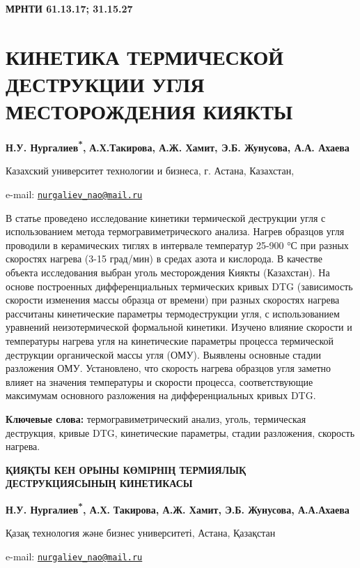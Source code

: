 \clearpage
{\bfseries МРНТИ 61.13.17; 31.15.27}

\section{КИНЕТИКА ТЕРМИЧЕСКОЙ ДЕСТРУКЦИИ УГЛЯ МЕСТОРОЖДЕНИЯ КИЯКТЫ}

\begin{center}
{\bfseries Н.У. Нургалиев\textsuperscript{*},} {\bfseries А.Х.Такирова, А.Ж.
Хамит, Э.Б. Жунусова, А.А. Ахаева}

Казахский университет технологии и бизнеса, г. Астана, Казахстан,

e-mail:
\href{mailto:nurgaliev_nao@mail.ru}{\nolinkurl{nurgaliev\_nao@mail.ru}}
\end{center}

В статье проведено исследование кинетики термической деструкции угля с
использованием метода термогравиметрического анализа. Нагрев образцов
угля проводили в керамических тиглях в интервале температур 25-900 °С
при разных скоростях нагрева (3-15 град/мин) в средах азота и кислорода.
В качестве объекта исследования выбран уголь месторождения Киякты
(Казахстан). На основе построенных дифференциальных термических кривых
DTG (зависимость скорости изменения массы образца от времени) при разных
скоростях нагрева рассчитаны кинетические параметры термодеструкции
угля, с использованием уравнений неизотермической формальной кинетики.
Изучено влияние скорости и температуры нагрева угля на кинетические
параметры процесса термической деструкции органической массы угля (ОМУ).
Выявлены основные стадии разложения ОМУ. Установлено, что скорость
нагрева образцов угля заметно влияет на значения температуры и скорости
процесса, соответствующие максимумам основного разложения на
дифференциальных кривых DTG.

{\bfseries Ключевые слова:} термогравиметрический анализ, уголь,
термическая деструкция, кривые DTG, кинетические параметры, стадии
разложения, скорость нагрева.

\begin{center}
{\large\bfseries ҚИЯҚТЫ КЕН ОРЫНЫ КӨМІРНІҢ ТЕРМИЯЛЫҚ ДЕСТРУКЦИЯСЫНЫҢ КИНЕТИКАСЫ}

{\bfseries Н.У. Нургалиев\textsuperscript{*}, А.Х.} {\bfseries Такирова, А.Ж.
Хамит, Э.Б. Жунусова, А.А.Ахаева}

Қазақ технология және бизнес университеті, Астана, Қазақстан

e-mail:
\href{mailto:nurgaliev_nao@mail.ru}{\nolinkurl{nurgaliev\_nao@mail.ru}}
\end{center}

